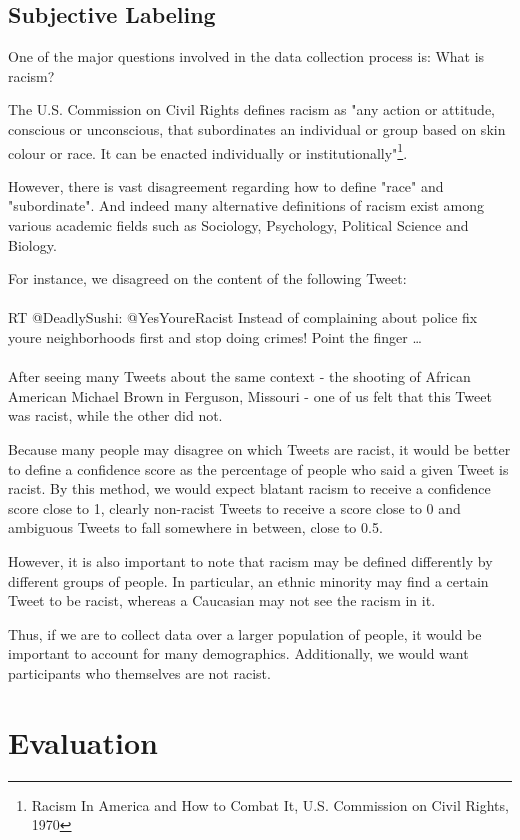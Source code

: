 \documentclass[]{article}
\begin{document}
\subsection{Subjective Labeling}

One of the major questions involved in the data collection process is: What is racism? 

The U.S. Commission on Civil Rights defines racism as "any action or attitude, conscious or unconscious, that subordinates an individual or group based on skin colour or race. It can be enacted individually or institutionally"\footnote[1]{Racism In America and How to Combat It, U.S. Commission on Civil Rights, 1970}.

However, there is vast disagreement regarding how to define "race" and "subordinate". And indeed many alternative definitions of racism exist among various academic fields such as Sociology, Psychology, Political Science and Biology.

For instance, we disagreed on the content of the following Tweet:
\\\\
	RT @DeadlySushi: @YesYoureRacist Instead of complaining about police fix youre neighborhoods first and stop doing crimes! Point the finger …
\\\\
After seeing many Tweets about the same context - the shooting of African American Michael Brown in Ferguson, Missouri - one of us felt that this Tweet was racist, while the other did not.

Because many people may disagree on which Tweets are racist, it would be better to define a confidence score as the percentage of people who said a given Tweet is racist. By this method, we would expect blatant racism to receive a confidence score close to 1, clearly non-racist Tweets to receive a score close to 0 and ambiguous Tweets to fall somewhere in between, close to 0.5.

However, it is also important to note that racism may be defined differently by different groups of people. In particular, an ethnic minority may find a certain Tweet to be racist, whereas a Caucasian may not see the racism in it.

Thus, if we are to collect data over a larger population of people, it would be important to account for many demographics. Additionally, we would want participants who themselves are not racist.

\section{Evaluation}
\end{document}
